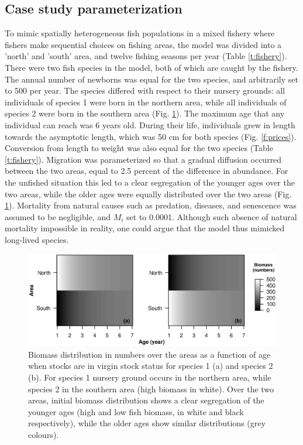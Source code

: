 \documentclass[12pt,oneline,a4paper,numbib]{ouparticle}
\numberwithin{equation}{subsection} %
\begin{document}
\subsection{Case study parameterization}

To mimic spatially heterogeneous fish populations in a mixed fishery where fishers make sequential choices on fishing areas, the model was divided into a 'north' and 'south' area, and twelve fishing seasons per year (Table \ref{t:fishery}). There were two fish species in the model, both of which are caught by the fishery. The annual number of newborns was equal for the two species, and arbitrarily set to 500 per year. The species differed with respect to their nursery grounds: all individuals of species 1 were born in the northern area, while all individuals of species 2 were born in the southern area (Fig. \ref{f:distribution}). The maximum age that any individual can reach was 6 years old. During their life, individuals grew in length towards the asymptotic length, which was 50 cm for both species (Fig. \ref{f:prices}). Conversion from length to weight was also equal for the two species (Table \ref{t:fishery}). Migration was parameterized so that a gradual diffusion occurred between the two areas, equal to 2.5 percent of the difference in abundance. For the unfished situation this led to a clear segregation of the younger ages over the two areas, while the older ages were equally distributed over the two areas (Fig. \ref{f:distribution}). Mortality from natural causes such as predation, diseases, and senescence was assumed to be negligible, and $M_i$ set to 0.0001. Although such absence of natural mortality impossible in reality, one could argue that the model thus mimicked long-lived species.

\begin{figure}[!ht]
\centering
\includegraphics[width=\textwidth]{Figures/Distributions.eps} 
\caption{Biomass distribution in numbers over the areas as a function of age when stocks are in virgin stock status for species 1 (a) and species 2 (b). For species 1 nursery ground occurs in the northern area, while species 2 in the southern area (high biomass in white). Over the two areas, initial biomass distribution shows a clear segregation of the younger ages (high and low fish biomass, in white and black respectively), while the older ages show similar distributions (grey colours).}
\label{f:distribution}
\end{figure}
  
\end{document}
